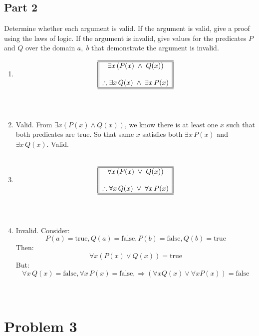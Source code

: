 \documentclass{amsart}
\theoremstyle{definition}
\theoremstyle{Exercise}
\theoremstyle{remark}
\theoremstyle{rule}
\numberwithin{equation}{section}
\begin{document}
\subsection*{Part 2}
Determine whether each argument is valid. If the argument is valid, give a proof using the laws of logic. If the argument is invalid, give values for the predicates $P$ and $Q$ over the domain ${a,\; b}$ that demonstrate the argument is invalid.\\
 \begin{enumerate}[label=(\alph*)]
\item \[
\begin{array}{||c||}
\hline \hline
\exists x\, (P(x)\; \land \;Q(x) )\\
\\
\therefore \exists x\, Q(x)\; \land\; \exists x \,P(x) \\
\hline \hline
\end{array}
\]\\\\
\item Valid. From \( \exists x (P(x) \land Q(x)) \), we know there is at least one \( x \) such that both predicates are true. So that same \( x \) satisfies both \( \exists x\,P(x) \) and \( \exists x\,Q(x) \). Valid.
 \\\\

\item \[
\begin{array}{||c||}
\hline \hline
\forall x\, (P(x)\; \lor \;Q(x) )\\
\\
\therefore \forall x\, Q(x)\; \lor \; \forall x\, P(x) \\
\hline \hline
\end{array}
\]\\\\
\item Invalid. Consider:
\[
P(a) = \text{true}, Q(a) = \text{false}, P(b) = \text{false}, Q(b) = \text{true}
\]
Then:
\[
\forall x (P(x) \lor Q(x)) = \text{true}
\]
But:
\[
\forall x\, Q(x) = \text{false}, \forall x\, P(x) = \text{false}, \Rightarrow (\forall x Q(x) \lor \forall x P(x)) = \text{false}
\]
 \\\\
 \end{enumerate}
 \newpage


\section*{Problem 3}
\end{document}

